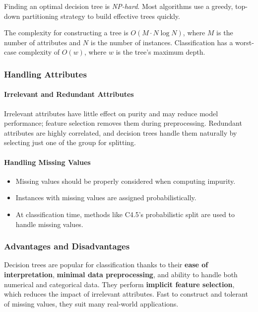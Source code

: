 Finding an optimal decision tree is \textit{NP-hard}. Most algorithms use a greedy, top-down partitioning strategy to build effective trees quickly.

The complexity for constructing a tree is $O(M \cdot N \log N)$, where $M$ is the number of attributes and $N$ is the number of instances. Classification has a worst-case complexity of $O(w)$, where $w$ is the tree's maximum depth.

\subsubsection{Handling Attributes}

\paragraph{Irrelevant and Redundant Attributes}
Irrelevant attributes have little effect on purity and may reduce model performance; feature selection removes them during preprocessing. Redundant attributes are highly correlated, and decision trees handle them naturally by selecting just one of the group for splitting.

\paragraph{Handling Missing Values}
\begin{itemize}
    \item Missing values should be properly considered when computing impurity.
    \item Instances with missing values are assigned probabilistically.
    \item At classification time, methods like C4.5's probabilistic split are used to handle missing values.
\end{itemize}

\subsubsection{Advantages and Disadvantages}

Decision trees are popular for classification thanks to their \textbf{ease of interpretation}, \textbf{minimal data preprocessing}, and ability to handle both numerical and categorical data. They perform \textbf{implicit feature selection}, which reduces the impact of irrelevant attributes. Fast to construct and tolerant of missing values, they suit many real-world applications.

